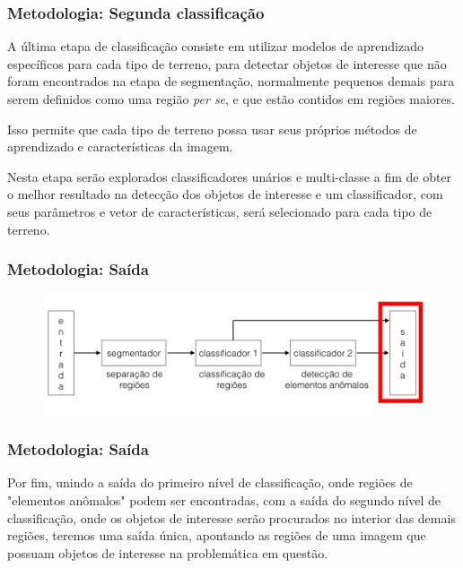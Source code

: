 \documentclass[t]{beamer}
\begin{document}
\begin{frame}
	\frametitle{Metodologia: Segunda classificação}

	A última etapa de classificação consiste em utilizar modelos de aprendizado específicos para cada tipo de terreno, para detectar objetos de interesse que não foram encontrados na etapa de segmentação, normalmente pequenos demais para serem definidos como uma região \textit{per se}, e que estão contidos em regiões maiores.

	\vspace{0.5cm} 

	Isso permite que cada tipo de terreno possa usar seus próprios métodos de aprendizado e características da imagem.

	\vspace{0.5cm}

	Nesta etapa serão explorados classificadores unários e multi-classe a fim de obter o melhor resultado na detecção dos objetos de interesse e um classificador, com seus parâmetros e vetor de características, será selecionado para cada tipo de terreno.
\end{frame}

\begin{frame}[c]
	\frametitle{Metodologia: Saída}
	\begin{figure}[h]
    	\includegraphics[width=\textwidth]{imgs/arquitetura_4}
	\end{figure}
\end{frame}

\begin{frame}
	\frametitle{Metodologia: Saída}

	Por fim, unindo a saída do primeiro nível de classificação, onde regiões de "elementos anômalos" podem ser encontradas, com a saída do segundo nível de classificação, onde os objetos de interesse serão procurados no interior das demais regiões, teremos uma saída única, apontando as regiões de uma imagem que possuam objetos de interesse na problemática em questão.

\end{frame}
\end{document}
